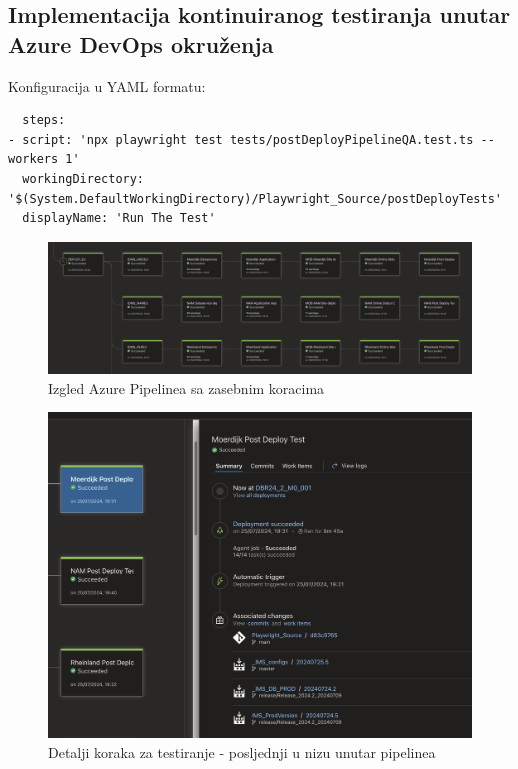 \subsection*{Implementacija kontinuiranog testiranja unutar Azure DevOps okruženja}

Konfiguracija u YAML formatu:
\begin{verbatim}
  steps:
- script: 'npx playwright test tests/postDeployPipelineQA.test.ts --workers 1'
  workingDirectory: '$(System.DefaultWorkingDirectory)/Playwright_Source/postDeployTests'
  displayName: 'Run The Test'
\end{verbatim}


\begin{figure}[!h]\begin{center}
  \includegraphics[width=1\textwidth]{"img/CI_pipelinePreview"}
  \caption{Izgled Azure Pipelinea sa zasebnim koracima}\label{img:CI_pipelinePreview}
\end{center}\end{figure}

\begin{figure}[!h]\begin{center}
  \includegraphics[width=1\textwidth]{"img/CI_pipelineDetails"}
  \caption{Detalji koraka za testiranje - posljednji u nizu unutar pipelinea}\label{img:CI_pipelineDetails}
\end{center}\end{figure}

